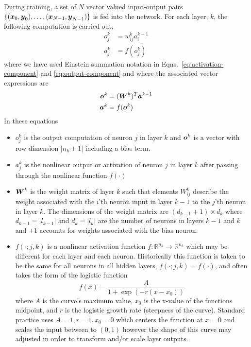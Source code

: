 \documentclass[12pt,notitlepage]{article}
\begin{document}
During training, a set of $N$ vector valued input-output pairs $\{(\boldsymbol{x}_{0},\boldsymbol{y}_{0}), \dots,
(\boldsymbol{x}_{N-1},\boldsymbol{y}_{N-1})\}$ is fed into the network.  For each layer, $k$, the
following computation is carried out,
\begin{align}
  \label{eq:activation-component}
  o_{j}^{k} &= w_{ij}^{k}a_{i}^{k-1}\\
  \label{eq:output-component}
  a_{j}^{k} &= f( o_{j}^{k})  
\end{align}
where we have used Einstein summation notation in
Eqns.~\ref{eq:activation-component} and \ref{eq:output-component} and
where the associated vector expressions are
\begin{align}
  \label{eq:activation-matrix}
  \boldsymbol{o}^{k} &= (\boldsymbol{W}^{k})^{T}\boldsymbol{a}^{k-1}\\
  \label{eq:output-matrix}
  \boldsymbol{a}^{k} &= f(\boldsymbol{o}^{k})
\end{align}
In these equations
\begin{itemize}
\item $o_{j}^{k}$ is the output computation of neuron $j$ in layer $k$
  and $\boldsymbol{o}^{k}$ is a vector with row dimension $|n_{k}+1|$ including a bias term.
\item $a_{j}^{k}$ is the nonlinear output or activation of neuron $j$ in layer $k$ after
  passing through the nonlinear function $f(\cdot)$
\item $\boldsymbol{W}^{k}$ is the weight matrix of layer $k$ such that
  elements $W_{ij}^{k}$ describe the weight associated with the $i$'th
  neuron input in layer $k-1$ to the $j$'th neuron in layer $k$.
  The dimensions of the weight matrix are $( d_{k-1} + 1 ) \times
  d_{k}$ where $d_{k-1} = |l_{k-1}|$ and $d_{k}
  = |l_{k}|$ are the number of neurons in layers $k-1$ and $k$ and
  $+1$ accounts for weights associated with the bias neuron.
\item $f(\cdot;j,k)$ is a nonlinear activation function $f: \mathbb{R}^{n_{k}} \to
  \mathbb{R}^{n_{k}}$ which may be different for each layer and each neuron.  Historically
  this function is taken to be the same for all neurons in all hidden
  layers,
  $f( \cdot; j,k ) = f( \cdot )$, and often takes the form of the
  logistic function
  \begin{equation}
    \label{eq:logistic-fun}
    f(x) = \frac{A}{1+\exp(-r(x-x_{0}))}
  \end{equation}
  where $A$ is the curve's maximum value, $x_{0}$ is the x-value of
  the functions midpoint, and $r$ is the logistic growth rate
  (steepness of the curve).  Standard practice uses $A=1, r=1, x_{0} =
  0$ which centers the function at $x=0$ and scales the input between
  to $(0,1)$ however the shape of this curve may adjusted in order to
  transform and/or scale layer outputs.
\end{itemize}
\end{document}
